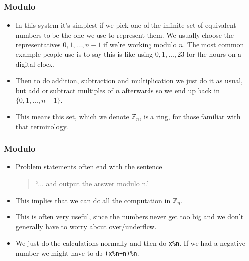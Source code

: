 \documentclass{beamer}
\begin{document}
\begin{frame}
  \frametitle{Modulo}
  \begin{itemize}
  \item In this system it's simplest if we pick one of the infinite set of equivalent numbers to be the one we use to represent them. We usually choose the representatives $0, 1, \dots, n - 1$ if we're working modulo $n$. The most common example people use is to say this is like using $0, 1, \dots, 23$ for the hours on a digital clock.
  \item<2-> Then to do addition, subtraction and multiplication we just do it as usual, but add or subtract multiples of $n$ afterwards so we end up back in $\{0, 1, \dots, n - 1\}$.
  \item<3-> This means this set, which we denote $\mathbb{Z}_n$, is a ring, for those familiar with that terminology.
  \end{itemize}
\end{frame}

\begin{frame}
  \frametitle{Modulo}
  \vspace{30pt}
  \begin{itemize}
    \item Problem statements often end with the sentence \\
      \vspace{10pt}
      \begin{quote}
``... and output the answer modulo n.''
      \end{quote}
      \vspace{10pt}
    \item This implies that we can do all the computation in $\mathbb{Z}_n$.
    \item This is often very useful, since the numbers never get too big and we don't generally have to worry about over/underflow.
    \item<4-> We just do the calculations normally and then do \texttt{x\%n}. If we had a negative number we might have to do \texttt{(x\%n+n)\%n}.
  \end{itemize}
\end{frame}
\end{document}
